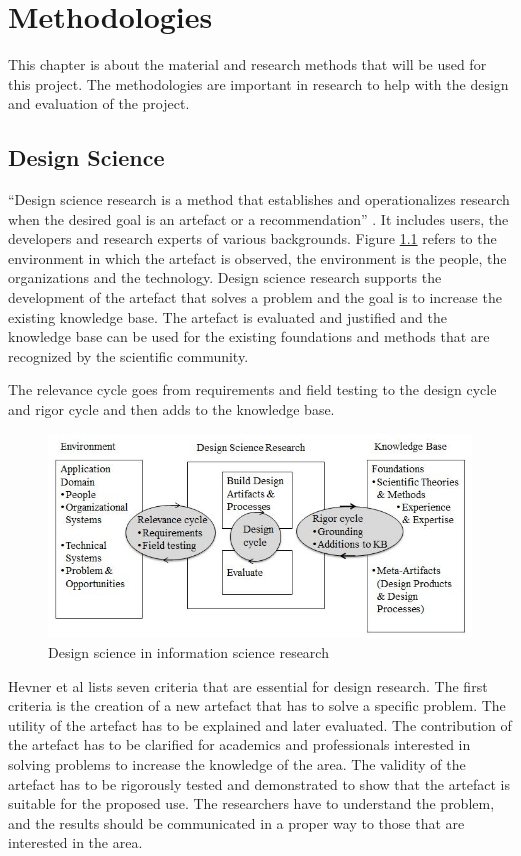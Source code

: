 \chapter{Methodologies}
This chapter is about the material and research methods that will be used for this project. The methodologies are important in research to help with the design and evaluation of the project. 
\section{Design Science}
“Design science research is a method that establishes and operationalizes research when the desired goal is an artefact or a recommendation” \cite{Dresch}. It includes users, the developers and research experts of various backgrounds.
Figure \ref{fig:Hevner2007} refers to the environment in which the artefact is observed, the environment is the people, the organizations and the technology. Design science research supports the development of the artefact that solves a problem and the goal is to increase the existing knowledge base. The artefact is evaluated and justified and the knowledge base can be used for the existing foundations and methods that are recognized by the scientific community.

The relevance cycle goes from requirements and field testing to the design cycle and rigor cycle and then adds to the knowledge base.
\begin{figure}[H]
    \centering
    \includegraphics[width=120mm]{figures/Design-Science-Research-Cycles-Hevner-2007.png}
    \caption{Design science in information science research \cite{Hevner2007}}
    \label{fig:Hevner2007}
\end{figure}

Hevner et al \cite{Hevner2004} lists seven criteria that are essential for design research. The first criteria is the creation of a new artefact that has to solve a specific problem. The utility of the artefact has to be explained and later evaluated. The contribution of the artefact has to be clarified for academics and professionals interested in solving problems to increase the knowledge of the area. The validity of the artefact has to be rigorously tested and demonstrated to show that the artefact is suitable for the proposed use. The researchers have to understand the problem, and the results should be communicated in a proper way to those that are interested in the area.

